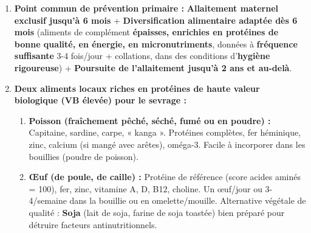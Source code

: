 \documentclass[11pt]{article}
\begin{document}
\begin{corrige}
\begin{enumerate}
\begin{center}
    \end{center}
    \item \textbf{Point commun de prévention primaire :} \textbf{Allaitement maternel exclusif jusqu'à 6 mois} + \textbf{Diversification alimentaire adaptée dès 6 mois} (aliments de complément \textbf{épaisses, enrichies en protéines de bonne qualité, en énergie, en micronutriments}, données à \textbf{fréquence suffisante} 3-4 fois/jour + collations, dans des conditions d'\textbf{hygiène rigoureuse}) + \textbf{Poursuite de l'allaitement jusqu'à 2 ans et au-delà}.
    \item \textbf{Deux aliments locaux riches en protéines de haute valeur biologique (VB élevée) pour le sevrage :}
    \begin{enumerate}
        \item \textbf{Poisson (fraîchement pêché, séché, fumé ou en poudre) :} Capitaine, sardine, carpe, « kanga ». Protéines complètes, fer héminique, zinc, calcium (si mangé avec arêtes), oméga-3. Facile à incorporer dans les bouillies (poudre de poisson).
        \item \textbf{Œuf (de poule, de caille) :} Protéine de référence (score acides aminés = 100), fer, zinc, vitamine A, D, B12, choline. Un œuf/jour ou 3-4/semaine dans la bouillie ou en omelette/mouille. Alternative végétale de qualité : \textbf{Soja} (lait de soja, farine de soja toastée) bien préparé pour détruire facteurs antinutritionnels.
    \end{enumerate}
\end{enumerate}
\end{corrige}
\end{document}

